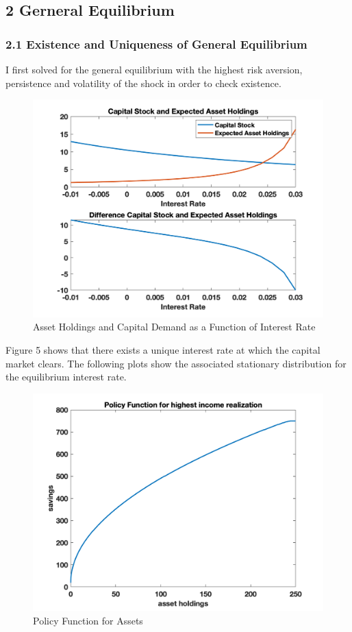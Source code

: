\documentclass[letterpaper,12pt]{article}
\begin{document}
\newpage
\subsection*{2 Gerneral Equilibrium}
\subsubsection*{2.1 Existence and Uniqueness of General Equilibrium}
I first solved for the general equilibrium with the highest risk aversion, persistence and volatility of the shock in order to check existence. \\
\begin{figure}
\includegraphics[scale=0.5]{Figures/Part2_GE/Capital_AssetHoldings}
\caption{Asset Holdings and Capital Demand as a Function of Interest Rate}
\end{figure}
Figure 5 shows that there exists a unique interest rate at which the capital market clears. The following plots show the associated stationary distribution for the equilibrium interest rate. \\
\begin{figure}
\includegraphics[scale=0.5]{Figures/Part2_GE/Policy_func_assets}
\caption{Policy Function for Assets}
\end{figure}
\end{document}
